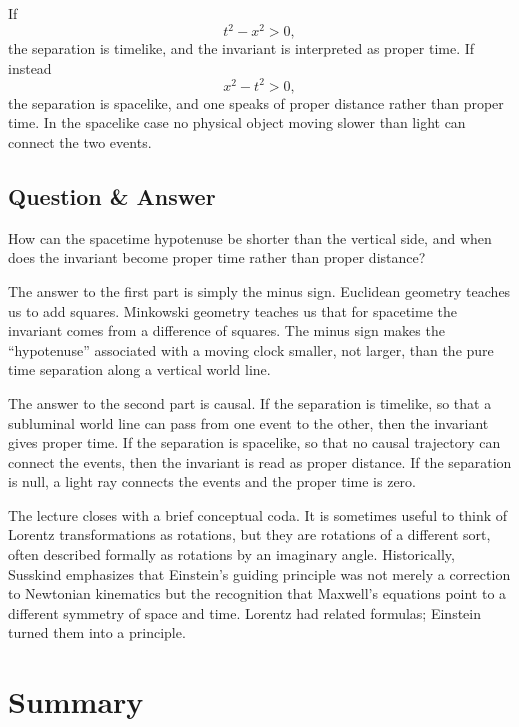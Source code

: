 If
\begin{equation}
t^2-x^2>0,
\end{equation}
the separation is timelike, and the invariant is interpreted as proper time. If instead
\begin{equation}
x^2-t^2>0,
\end{equation}
the separation is spacelike, and one speaks of proper distance rather than proper time. In the spacelike case no physical object moving slower than light can connect the two events.

\subsection{Question \& Answer}

How can the spacetime hypotenuse be shorter than the vertical side, and when does the invariant become proper time rather than proper distance?

The answer to the first part is simply the minus sign. Euclidean geometry teaches us to add squares. Minkowski geometry teaches us that for spacetime the invariant comes from a difference of squares. The minus sign makes the ``hypotenuse'' associated with a moving clock smaller, not larger, than the pure time separation along a vertical world line.

The answer to the second part is causal. If the separation is timelike, so that a subluminal world line can pass from one event to the other, then the invariant gives proper time. If the separation is spacelike, so that no causal trajectory can connect the events, then the invariant is read as proper distance. If the separation is null, a light ray connects the events and the proper time is zero.

The lecture closes with a brief conceptual coda. It is sometimes useful to think of Lorentz transformations as rotations, but they are rotations of a different sort, often described formally as rotations by an imaginary angle. Historically, Susskind emphasizes that Einstein's guiding principle was not merely a correction to Newtonian kinematics but the recognition that Maxwell's equations point to a different symmetry of space and time. Lorentz had related formulas; Einstein turned them into a principle.

\section{Summary}

